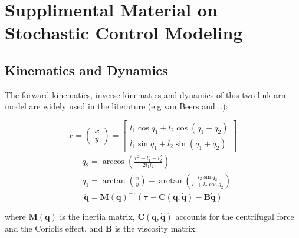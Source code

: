\chapter{Supplimental Material on Stochastic Control Modeling}
\label{app:oc}

\section{Kinematics and Dynamics}
The forward kinematics, inverse kinematics and dynamics of this two-link arm model are widely used in the literature (e.g van Beers and ..):

\begin{equation}
	\bm{r} =\left(\begin{matrix} x\\y \end{matrix}\right) %
	= \left[ \begin{matrix}  l_1\cos{q_1} + l_2\cos{(q_1+q_2)} \\ l_1\sin{q_1} + l_2\sin{(q_1+q_2)}  \end{matrix} \right]
\end{equation}
\begin{equation}
	\begin{split}
	& q_2 = \arccos{\left(\frac{r^2-l_1^2-l_2^2}{2l_1l_2}\right)} \\
	& q_1 = \arctan{\left( \frac{x}{y} \right)} - \arctan{\left(\frac{l_2\sin{q_2}}{l_1+l_2\cos q_2 }\right)}
	\end{split}
\end{equation}
\begin{equation} \label{dynamics}
	\ddot{\bm{q}} = \bm{M}(\bm{q})^{-1} (\bm{\tau} - \bm{C}(\bm{q}, \dot{\bm{q}}) - \bm{B}\dot{\bm{q}})
\end{equation}

where $\bm{M}(\bm{q})$ is the inertia matrix, $\bm{C}(\bm{q}, \dot{\bm{q}})$ accounts for the centrifugal force and the Coriolis effect, and $\bm{B}$ is the viscosity matrix:

